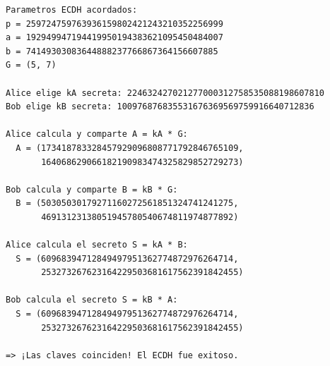 \documentclass[12pt,a4paper]{article}
\begin{document}
\begin{verbatim}
Parametros ECDH acordados:
p = 259724759763936159802421243210352256999
a = 192949947194419950194383621095450484007
b = 74149303083644888237766867364156607885
G = (5, 7)

Alice elige kA secreta: 224632427021277000312758535088198607810
Bob elige kB secreta: 100976876835531676369569759916640712836

Alice calcula y comparte A = kA * G:
  A = (173418783328457929096808771792846765109, 
       164068629066182190983474325829852729273)

Bob calcula y comparte B = kB * G:
  B = (50305030179271160272561851324741241275, 
       46913123138051945780540674811974877892)

Alice calcula el secreto S = kA * B:
  S = (60968394712849497951362774872976264714, 
       253273267623164229503681617562391842455)

Bob calcula el secreto S = kB * A:
  S = (60968394712849497951362774872976264714, 
       253273267623164229503681617562391842455)

=> ¡Las claves coinciden! El ECDH fue exitoso.
\end{verbatim}
\end{document}
